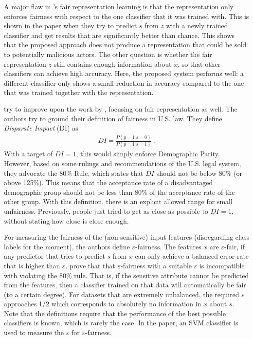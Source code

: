 A major flaw in \citet{zemel2013learning}'s fair representation learning is
that the representation only enforces fairness
with respect to the one classifier that it was trained with.
This is shown in the paper when they try to predict \(s\) from \(z\) with a newly trained classifier
and get results that are significantly better than chance.
This shows that the proposed approach does not produce a representation
that could be sold to potentially malicious actors.
The other question is
whether the fair representation \(z\) still contains enough information about \(x\),
so that other classifiers can achieve high accuracy.
Here, the proposed system performs well:
a different classifier only shows a small reduction in accuracy
compared to the one that was trained together with the representation.

\citet{feldman2015certifying} try to improve upon the work by \citet{zemel2013learning},
focusing on fair representation as well.
The authors try to ground their definition of fairness in U.S. law.
They define \emph{Disparate Impact} (DI) as
\begin{align}
  \label{eq:disparate-impace}
  DI = \frac{P(y=1|s=0)}{P(y=1|s=1)} ~.
\end{align}
With a target of \(DI = 1\), this would simply enforce Demographic Parity.
However, based on some rulings and recommendations of the U.S. legal system,
they advocate the 80\% Rule, which states that \(DI\) should not be below 80\% (or above 125\%).
This means that the acceptance rate of a disadvantaged demographic group
should not be less than 80\% of the acceptance rate of the other group.
With this definition, there is an explicit allowed range for small unfairness.
Previously, people just tried to get as close as possible to \(DI = 1\),
without stating how close is close enough.

For measuring the fairness of the (non-sensitive) input features
(disregarding class labels for the moment), the authors define \(\varepsilon\)-fairness.
The features \(x\) are \(\varepsilon\)-fair,
if any predictor that tries to predict \(s\) from \(x\) can only achieve a balanced error rate
that is higher than \(\varepsilon\).
\citet{feldman2015certifying} prove that that \(\varepsilon\)-fairness with a suitable \(\varepsilon\)
is incompatible with violating the 80\% rule.
That is, if the sensitive attribute cannot be predicted from the features,
then a classifier trained on that data will automatically be fair (to a certain degree).
For datasets that are extremely unbalanced,
the required \(\varepsilon\) approaches 1/2
which corresponds to absolutely no information in \(x\) about \(s\).
Note that the definitions require that the performance of the best possible classifiers is known,
which is rarely the case.
In the paper, an \ac{SVM} classifier is used to measure the \(\varepsilon\) for \(\varepsilon\)-fairness.

